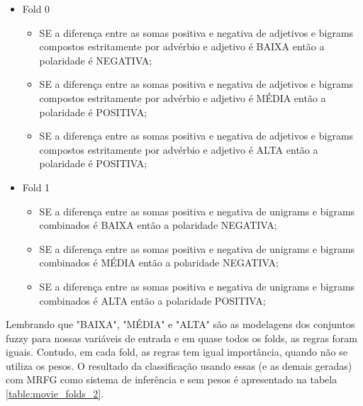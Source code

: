 \documentclass[template.tex]{subfiles}
\begin{document}
\begin{itemize}
\item Fold 0
\begin{itemize}
\item SE a diferença entre as somas positiva e negativa de adjetivos e bigrams compostos estritamente por advérbio e adjetivo é BAIXA então a polaridade é NEGATIVA;
\item SE a diferença entre as somas positiva e negativa de adjetivos e bigrams compostos estritamente por advérbio e adjetivo é MÉDIA então a polaridade é POSITIVA;
\item SE a diferença entre as somas positiva e negativa de adjetivos e bigrams compostos estritamente por advérbio e adjetivo é ALTA então a polaridade é POSITIVA;
\end{itemize}
\item Fold 1
\begin{itemize}
\item SE a diferença entre as somas positiva e negativa de unigrams e bigrams combinados é BAIXA então a polaridade NEGATIVA;
\item SE a diferença entre as somas positiva e negativa de unigrams e bigrams combinados é MÉDIA então a polaridade NEGATIVA;
\item SE a diferença entre as somas positiva e negativa de unigrams e bigrams combinados é ALTA então a polaridade POSITIVA;
\end{itemize}
\end{itemize}

Lembrando que "BAIXA", "MÉDIA" e "ALTA" são as modelagens dos conjuntos fuzzy para nossas variáveis de entrada e em quase todos os folds, as regras foram iguais. Contudo, em cada fold, as regras tem igual importância, quando não se utiliza os pesos. O resultado da classificação usando essas (e as demais geradas) com MRFG como sistema de inferência e sem pesos é apresentado na tabela \ref{table:movie_folds_2}.
\end{document}
